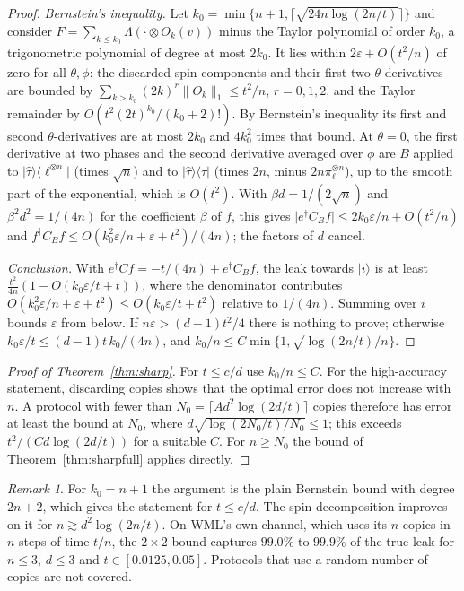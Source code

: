 \documentclass[11pt]{article}
\theoremstyle{remark}
\newtheorem{remark}[theorem]{Remark}
\newcommand{\tn}[1]{\lVert #1 \rVert_1}
\newcommand{\ket}[1]{\lvert #1 \rangle}
\newcommand{\bra}[1]{\langle #1 \rvert}
\newcommand{\proj}[1]{\lvert #1 \rangle\langle #1 \rvert}
\begin{document}
\begin{proof}
\emph{Bernstein's inequality.} Let $k_0 = \min\{n+1, \lceil\sqrt{24 n\log(2n/t)}\rceil\}$ and consider $F = \sum_{k \le k_0}\Lambda(\cdot\otimes O_k(v))$ minus the Taylor polynomial of order $k_0$, a trigonometric polynomial of degree at most $2k_0$. It lies within $2\varepsilon + O(t^2/n)$ of zero for all $\theta, \phi$: the discarded spin components and their first two $\theta$-derivatives are bounded by $\sum_{k>k_0}(2k)^r\tn{O_k} \le t^2/n$, $r = 0,1,2$, and the Taylor remainder by $O(t^2(2t)^{k_0}/(k_0+2)!)$. By Bernstein's inequality its first and second $\theta$-derivatives are at most $2k_0$ and $4k_0^2$ times that bound. At $\theta = 0$, the first derivative at two phases and the second derivative averaged over $\phi$ are $B$ applied to $\ket{\hat\tau}\bra{\ell^{\otimes n}}$ (times $\sqrt n$) and to $\proj{\hat\tau}$ (times $2n$, minus $2n\pi_\ell^{\otimes n}$), up to the smooth part of the exponential, which is $O(t^2)$. With $\beta d = 1/(2\sqrt n)$ and $\beta^2 d^2 = 1/(4n)$ for the coefficient $\beta$ of $f$, this gives $\lvert e^\dagger C_B f\rvert \le 2k_0\varepsilon/n + O(t^2/n)$ and $f^\dagger C_B f \le O(k_0^2\varepsilon/n + \varepsilon + t^2)/(4n)$; the factors of $d$ cancel.

\emph{Conclusion.} With $e^\dagger C f = -t/(4n) + e^\dagger C_B f$, the leak towards $\ket{i}$ is at least $\tfrac{t^2}{4n}(1 - O(k_0\varepsilon/t + t))$, where the denominator contributes $O(k_0^2\varepsilon/n + \varepsilon + t^2) \le O(k_0\varepsilon/t + t^2)$ relative to $1/(4n)$. Summing over $i$ bounds $\varepsilon$ from below. If $n\varepsilon > (d-1)t^2/4$ there is nothing to prove; otherwise $k_0\varepsilon/t \le (d-1)t\,k_0/(4n)$, and $k_0/n \le C\min\{1, \sqrt{\log(2n/t)/n}\}$.
\end{proof}

\begin{proof}[Proof of Theorem~\ref{thm:sharp}]
For $t \le c/d$ use $k_0/n \le C$. For the high-accuracy statement, discarding copies shows that the optimal error does not increase with $n$. A protocol with fewer than $N_0 = \lceil A d^2 \log(2d/t)\rceil$ copies therefore has error at least the bound at $N_0$, where $d\sqrt{\log(2N_0/t)/N_0} \le 1$; this exceeds $t^2/(Cd\log(2d/t))$ for a suitable $C$. For $n \ge N_0$ the bound of Theorem~\ref{thm:sharpfull} applies directly.
\end{proof}

\begin{remark}
For $k_0 = n+1$ the argument is the plain Bernstein bound with degree $2n+2$, which gives the statement for $t \le c/d$. The spin decomposition improves on it for $n \gtrsim d^2\log(2n/t)$. On WML's own channel, which uses its $n$ copies in $n$ steps of time $t/n$, the $2\times 2$ bound captures $99.0\%$ to $99.9\%$ of the true leak for $n \le 3$, $d \le 3$ and $t \in [0.0125, 0.05]$. Protocols that use a random number of copies are not covered.
\end{remark}
\end{document}
